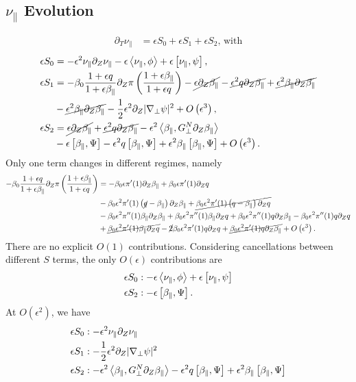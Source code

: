 \documentclass{article}
\newcommand{\para}{\parallel}
\newcommand{\ep}{\epsilon}
\newcommand{\np}{\nabla_\perp}
\newcommand{\p}{\partial}
\newcommand{\fr}{\frac{1+\ep q}{1+\ep\beta_\para}}
\newcommand{\frinv}{\frac{1+\ep\beta_\para}{1+\ep q}}
\newcommand{\GN}{G_\perp^N}
\newcommand{\pth} [1] {\left( #1 \right) }
\newcommand{\br} [1] {\left[ #1 \right] }
\begin{document}
\subsection{$\nu_\para$ Evolution}
\begin{align} 
    \p_T\nu_\para &= \ep S_0 + \ep S_1 + \ep S_2 \text{, with}
\end{align}
\begin{align*}
    \ep S_0 &= -\ep^2\nu_\para \p_Z\nu_\para - \ep\Braket{\nu_\para, \phi} + \ep\br{\nu_\para, \psi}, \\ 
    \ep  S_1 &= -\beta_0\fr\p_Z\pi\pth{\frinv} - \cancel{\ep\p_Z\beta_\para} - \cancel{\ep^2q\p_Z\beta_\para} + \cancel{\ep^2\beta_\para\p_Z\beta_\para} \\ 
        &- \cancel{\ep^2\beta_\para\p_Z\beta_\para} - \frac{1}{2}\ep^2\p_Z |\np\psi|^2 + O\pth{\ep^3}, \\ 
    \ep S_2 &= \cancel{\ep\p_Z\beta_\para} + \cancel{\ep^2 q\p_Z\beta_\para} - \ep^2\Braket{\beta_\para, \GN\p_Z\beta_\para} \\ 
        &- \ep\br{\beta_\para, \Psi} - \ep^2q\br{\beta_\para, \Psi} + \ep^2\beta_\para \br{\beta_\para, \Psi} + O\pth{\ep^3}. 
\end{align*}
Only one term changes in different regimes, namely 
\begin{align*}
    -\beta_0\fr\p_Z\pi\pth{\frinv} &= - \beta_0\ep\pi'(1) \p_Z\beta_\para + \beta_0\ep\pi'(1) \p_Zq \\ 
        &- \beta_0\ep^2\pi'(1) \pth{\cancel{q}-\beta_\para} \p_Z\beta_\para + \cancel{\beta_0\ep^2\pi'(1) \pth{q-\beta_\para} \p_Zq} \\ 
        &- \beta_0\ep^2\pi''(1) \beta_\para\p_Z \beta_\para + \beta_0\ep^2\pi''(1) \beta_\para\p_Zq + \beta_0\ep^2\pi''(1) q\p_Z\beta_\para - \beta_0\ep^2\pi''(1) q\p_Z q \\ 
        &+ \cancel{\beta_0\ep^2\pi'(1) \beta_\para\p_Zq} - \cancel{2}\beta_0\ep^2\pi'(1) q\p_Z q + \cancel{\beta_0\ep^2\pi'(1) q\p_Z\beta_\para} + O\pth{\ep^3}. 
\end{align*}
There are no explicit $O(1)$ contributions. Considering cancellations between different $S$ terms, the only $O(\ep)$ contributions are
\begin{align*}
    \ep S_0 &: - \ep\Braket{\nu_\para, \phi} + \ep\br{\nu_\para, \psi} \\ 
    \ep S_2 &: - \ep\br{\beta_\para, \Psi}. 
\end{align*}
At $O\pth{\ep^2}$, we have 
\begin{align*}
    \ep S_0 &: -\ep^2\nu_\para \p_Z\nu_\para \\ 
    \ep S_1 &: - \frac{1}{2}\ep^2\p_Z |\np\psi|^2 \\ 
    \ep S_2 &: - \ep^2\Braket{\beta_\para, \GN\p_Z\beta_\para} - \ep^2q\br{\beta_\para, \Psi} + \ep^2\beta_\para \br{\beta_\para, \Psi}
\end{align*}
\end{document}

